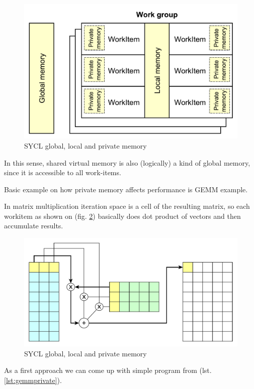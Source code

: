 \documentclass[a4paper,12pt,oneside]{article}
\begin{document}
\begin{figure}
\centering
\includegraphics[width=1.0\textwidth]{pictures/sycl-privatemem.pdf}
\caption{SYCL global, local and private memory}
\label{fig:sycl-privatemem}
\end{figure}

In this sense, shared virtual memory is also (logically) a kind of global memory, since it is accessible to all work-items.

Basic example on how private memory affects performance is GEMM example.

In matrix multiplication iteration space is a cell of the resulting matrix, so each workitem as shown on (fig. \ref{fig:iter-space-matrix}) basically does dot product of vectors and then accumulate results. 

\begin{figure}
\centering
\includegraphics[width=1.0\textwidth]{pictures/iter-space-matrix.pdf}
\caption{SYCL global, local and private memory}
\label{fig:iter-space-matrix}
\end{figure}

As a first approach we can come up with simple program from (lst. \ref{lst:gemmprivate}). 
\end{document}
